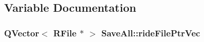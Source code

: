 \subsection{Variable Documentation}
\hypertarget{namespace_save_all_a7571694eeff65421df3576ca43e3062e}{
\subsubsection[{ride\-File\-Ptr\-Vec}]{\setlength{\rightskip}{0pt plus 5cm}Q\-Vector$<$ {\bf R\-File} $\ast$ $>$ Save\-All\-::ride\-File\-Ptr\-Vec}}\label{namespace_save_all_a7571694eeff65421df3576ca43e3062e}

